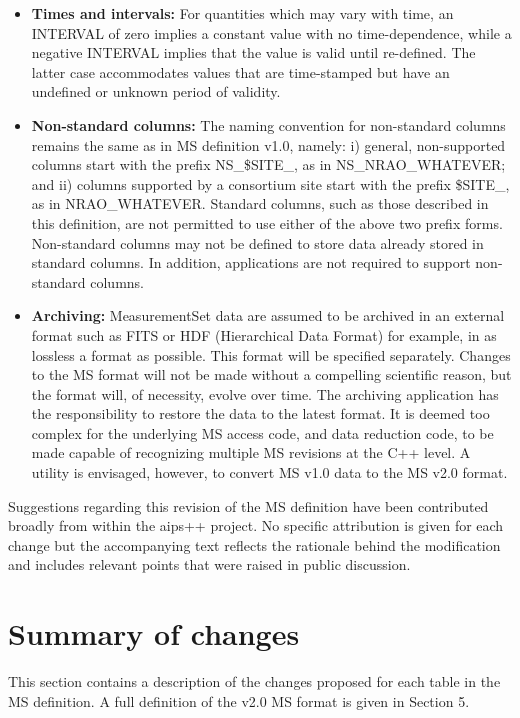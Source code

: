 \documentclass{article}
\begin{document}
\begin{itemize}
\item{{\bf Times and intervals:} For quantities which may vary with
time, an INTERVAL of zero implies a constant value with no
time-dependence, while a negative INTERVAL implies that the value is
valid until re-defined. The latter case accommodates values that are
time-stamped but have an undefined or unknown period of validity.}

\item{{\bf Non-standard columns:} The naming convention for
non-standard columns remains the same as in MS definition v1.0,
namely: i) general, non-supported columns start with the prefix
NS\_\$SITE\_, as in NS\_NRAO\_WHATEVER; and ii) columns supported by a
consortium site start with the prefix \$SITE\_, as in
NRAO\_WHATEVER. Standard columns, such as those described in this
definition, are not permitted to use either of the above two prefix
forms. Non-standard columns may not be defined to store data already
stored in standard columns. In addition, applications are not required
to support non-standard columns.}

\item{{\bf Archiving:} MeasurementSet data are assumed to be archived
in an external format such as FITS or HDF (Hierarchical Data Format)
for example, in as lossless a format as possible. This format will be
specified separately. Changes to the MS format will not be made
without a compelling scientific reason, but the format will, of
necessity, evolve over time. The archiving application has the
responsibility to restore the data to the latest format. It is deemed
too complex for the underlying MS access code, and data reduction
code, to be made capable of recognizing multiple MS revisions at the
C++ level. A utility is envisaged, however, to convert MS v1.0 data to
the MS v2.0 format.}

\end{itemize}

Suggestions regarding this revision of the MS definition have been
contributed broadly from within the aips++ project. No specific
attribution is given for each change but the accompanying text
reflects the rationale behind the modification and includes relevant
points that were raised in public discussion.

\section{Summary of changes}

This section contains a description of the changes proposed for each
table in the MS definition. A full definition of the v2.0 MS format is
given in Section 5.
\end{document}
